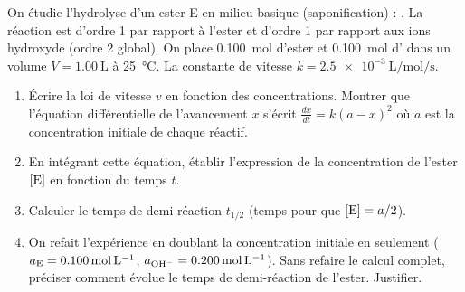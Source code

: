 \documentclass[11pt]{article}
\begin{document}
\begin{exercice}
On étudie l'hydrolyse d'un ester E en milieu basique (saponification) : . La réaction est d'ordre 1 par rapport à l'ester et d'ordre 1 par rapport aux ions hydroxyde (ordre 2 global). On place \SI{0,100}{\mol} d'ester et \SI{0,100}{\mol} d' dans un volume $V = \SI{1,00}{\liter}$ à \SI{25}{\celsius}. La constante de vitesse $k = \SI{2,5e-3}{\liter\per\mol\per\second}$.
\begin{enumerate}
\item Écrire la loi de vitesse $v$ en fonction des concentrations. Montrer que l'équation différentielle de l'avancement $x$ s'écrit $\frac{dx}{dt} = k (a - x)^2$ où $a$ est la concentration initiale de chaque réactif.
\item En intégrant cette équation, établir l'expression de la concentration de l'ester $[\ce{E}]$ en fonction du temps $t$.
\item Calculer le temps de demi-réaction $t_{1/2}$ (temps pour que $[\ce{E}] = a/2$).
\item On refait l'expérience en doublant la concentration initiale en  seulement ($a_{\ce{E}} = \SI{0,100}{\mol\per\liter}$, $a_{\ce{OH-}} = \SI{0,200}{\mol\per\liter}$). Sans refaire le calcul complet, préciser comment évolue le temps de demi-réaction de l'ester. Justifier.
\end{enumerate}
\end{exercice}
\end{document}
